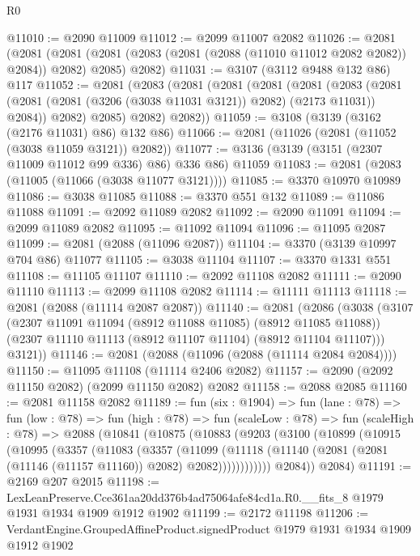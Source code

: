 \begin{lexlean}{R0}
\begin{coremodule}
@11010 := @2090 @11009
@11012 := @2099 @11007 @2082
@11026 := @2081
    (@2081
      (@2081 (@2081 (@2083 (@2081 (@2088 (@11010 @11012 @2082 @2082)) @2084)) @2082) @2085)
      @2082)
@11031 := @3107 (@3112 @9488 @132 @86) @117
@11052 := @2081
    (@2083
      (@2081
        (@2081
          (@2081
            (@2081
              (@2083
                (@2081 (@2081 (@2081 (@3206 (@3038 @11031 @3121)) @2082) (@2173 @11031)) @2084))
              @2082)
            @2085)
          @2082)
        @2082))
@11059 := @3108 (@3139 (@3162 (@2176 @11031) @86) @132 @86)
@11066 := @2081 (@11026 (@2081 (@11052 (@3038 @11059 @3121)) @2082))
@11077 := @3136 (@3139 (@3151 (@2307 @11009 @11012 @99 @336) @86) @336 @86) @11059
@11083 := @2081 (@2083 (@11005 (@11066 (@3038 @11077 @3121))))
@11085 := @3370 @10970 @10989
@11086 := @3038 @11085
@11088 := @3370 @551 @132
@11089 := @11086 @11088
@11091 := @2092 @11089 @2082
@11092 := @2090 @11091
@11094 := @2099 @11089 @2082
@11095 := @11092 @11094
@11096 := @11095 @2087
@11099 := @2081 (@2088 (@11096 @2087))
@11104 := @3370 (@3139 @10997 @704 @86) @11077
@11105 := @3038 @11104
@11107 := @3370 @1331 @551
@11108 := @11105 @11107
@11110 := @2092 @11108 @2082
@11111 := @2090 @11110
@11113 := @2099 @11108 @2082
@11114 := @11111 @11113
@11118 := @2081 (@2088 (@11114 @2087 @2087))
@11140 := @2081
    (@2086
      (@3038
        (@3107
          (@2307 @11091 @11094 (@8912 @11088 @11085) (@8912 @11085 @11088))
          (@2307 @11110 @11113 (@8912 @11107 @11104) (@8912 @11104 @11107)))
        @3121))
@11146 := @2081 (@2088 (@11096 (@2088 (@11114 @2084 @2084))))
@11150 := @11095 @11108 (@11114 @2406 @2082)
@11157 := @2090 (@2092 @11150 @2082) (@2099 @11150 @2082) @2082
@11158 := @2088 @2085
@11160 := @2081 @11158 @2082
@11189 := fun (six : @1904) =>
  fun (lane : @78) =>
  fun (low : @78) =>
  fun (high : @78) =>
  fun (scaleLow : @78) =>
  fun (scaleHigh : @78) =>
  @2088
    (@10841
      (@10875
        (@10883
          (@9203
            (@3100
              (@10899
                (@10915
                  (@10995
                    (@3357
                      (@11083
                        (@3357
                          (@11099
                            (@11118
                              (@11140
                                (@2081 (@2081 (@11146 (@11157 @11160)) @2082) @2082))))))))))))
          @2084))
      @2084)
@11191 := @2169 @207 @2015
@11198 := LexLeanPreserve.Cce361aa20dd376b4ad75064afe84cd1a.R0.__fits_8
    @1979
    @1931
    @1934
    @1909
    @1912
    @1902
@11199 := @2172 @11198
@11206 := VerdantEngine.GroupedAffineProduct.signedProduct @1979 @1931 @1934 @1909 @1912 @1902

\end{coremodule}
\end{lexlean}
